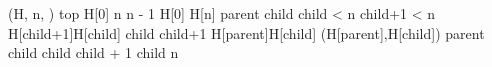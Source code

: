 \documentclass[12pt]{article}
\begin{document}
\begin{program}
(H, n, \preceq)
top \gets H[0]
n \gets n - 1
H[0] \gets H[n]
parent 
child 
\WHILE child < n \DO
  \IF child+1 < n 
  \THEN
  \IF H[child+1]\preceq H[child] 
  \THEN
    child \gets child+1
  \FI 
  \FI
  \IF H[parent]\not\preceq H[child]
  \THEN {}(H[parent],H[child])
        parent \gets child
        child \cdot child + 1
  \ELSE child \gets n
  \FI
\OD
\end{program}

\end{document}
